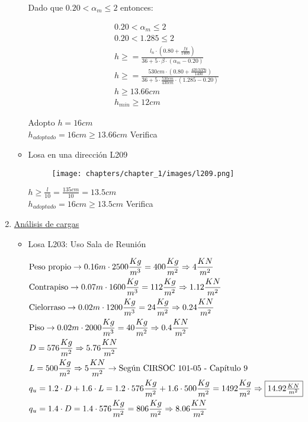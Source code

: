 \begin{enumerate}
\begin{itemize}
Dado que $0.20 < \alpha_m \leq 2 $ entonces:

\begin{align*}
& 0.20 < \alpha_m \leq 2 \\
& 0.20 < 1.285 \leq 2 \\
& h \geq = \frac{l_n \cdot (0.80+ \frac{fy}{1400})}{36+ 5 \cdot \beta \cdot (\alpha_m - 0.20)} \\
& h \geq = \frac{530cm \cdot (0.80+ \frac{420MPa}{1400})}{36+ 5 \cdot \frac{530cm}{430cm} \cdot (1.285 - 0.20)} \\
& h \geq 13.66cm \\
& h_{min} \geq 12cm
\end{align*}

Adopto $h = 16cm$ \\
$h_{adoptado} = 16 cm \geq 13.66cm$ Verifica \\

\item Losa en una dirección L209\\

\begin{figure}[H]
\begin{center}
     \texttt{[image: chapters/chapter\_1/images/l209.png]}
\end{center}
\end{figure}

$h \geq \frac{l}{10} = \frac{135cm}{10} = 13.5cm$ \\
$h_{adoptado} = 16 cm \geq 13.5cm$ Verifica
\end{itemize}

\item \underline{Análisis de cargas}\\
\begin{itemize}
\item Losa L203: Uso Sala de Reunión

\begin{align*}
& \text{Peso propio} \rightarrow 0.16m \cdot 2500 \frac{Kg}{m^3} = 400 \frac{Kg}{m^2} \Rightarrow 4 \frac{KN}{m^2} \\
& \text{Contrapiso} \rightarrow 0.07m \cdot 1600 \frac{Kg}{m^3} = 112 \frac{Kg}{m^2} \Rightarrow 1.12 \frac{KN}{m^2} \\
& \text{Cielorraso} \rightarrow 0.02m \cdot 1200 \frac{Kg}{m^3} = 24 \frac{Kg}{m^2} \Rightarrow 0.24 \frac{KN}{m^2} \\
& \text{Piso} \rightarrow 0.02m \cdot 2000 \frac{Kg}{m^3} = 40 \frac{Kg}{m^2} \Rightarrow 0.4 \frac{KN}{m^2} \\
& D = 576 \frac{Kg}{m^2} \Rightarrow 5.76 \frac{KN}{m^2} \\
& L = 500 \frac{Kg}{m^2} \Rightarrow 5 \frac{KN}{m^2} \rightarrow \text{Según CIRSOC 101-05 - Capítulo 9}\\
& q_u = 1.2 \cdot D + 1.6 \cdot L = 1.2 \cdot 576 \frac{Kg}{m^2} + 1.6 \cdot 500 \frac{Kg}{m^2} = 1492 \frac{Kg}{m^2} \Rightarrow \framebox{$14.92 \frac{KN}{m^2}$} \\
& q_u = 1.4 \cdot D = 1.4 \cdot 576 \frac{Kg}{m^2} = 806 \frac{Kg}{m^2} \Rightarrow 8.06 \frac{KN}{m^2}
\end{align*}


\end{itemize}
\end{enumerate}
